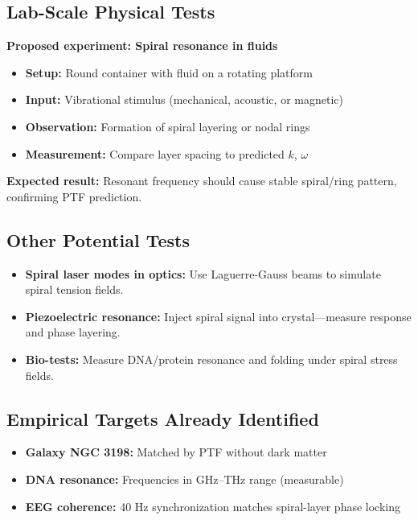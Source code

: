 \documentclass[a4paper,12pt]{article}
\begin{document}
\subsection{Lab-Scale Physical Tests}

\textbf{Proposed experiment: Spiral resonance in fluids}

\begin{itemize}
    \item \textbf{Setup:} Round container with fluid on a rotating platform
    \item \textbf{Input:} Vibrational stimulus (mechanical, acoustic, or magnetic)
    \item \textbf{Observation:} Formation of spiral layering or nodal rings
    \item \textbf{Measurement:} Compare layer spacing to predicted $k$, $\omega$
\end{itemize}

\textbf{Expected result:}  
Resonant frequency should cause stable spiral/ring pattern, confirming PTF prediction.

\subsection{Other Potential Tests}

\begin{itemize}
    \item \textbf{Spiral laser modes in optics:} Use Laguerre-Gauss beams to simulate spiral tension fields.
    \item \textbf{Piezoelectric resonance:} Inject spiral signal into crystal—measure response and phase layering.
    \item \textbf{Bio-tests:} Measure DNA/protein resonance and folding under spiral stress fields.
\end{itemize}

\subsection{Empirical Targets Already Identified}

\begin{itemize}
    \item \textbf{Galaxy NGC 3198:} Matched by PTF without dark matter
    \item \textbf{DNA resonance:} Frequencies in GHz–THz range (measurable)
    \item \textbf{EEG coherence:} 40 Hz synchronization matches spiral-layer phase locking
\end{itemize}
\end{document}
